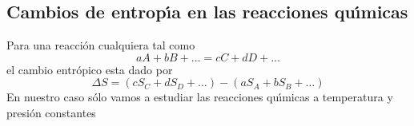 \subsection{Cambios de entrop\'{\i}a en las reacciones qu\'{\i}micas}
Para una reacci\'on cual\-quie\-ra tal como
\begin{equation}
aA +bB +\ldots = cC + dD + \ldots
\end{equation}
el cambio entr\'opico esta dado por
\begin{equation}
\Delta S = (cS_C + dS_D + \ldots) - (aS_A + bS_B + \ldots)
\end{equation}
En nuestro caso s\'olo vamos a estudiar las reacciones qu\'{\i}micas a tem\-pe\-ratura y presi\'on constantes
%

